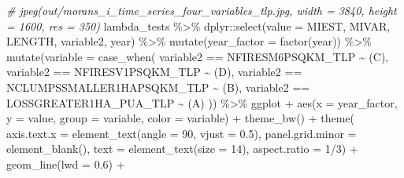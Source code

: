 \documentclass[10pt,landscape,a3paper]{article}
\newenvironment{Shaded}{\begin{snugshade}}{\end{snugshade}}
\newcommand{\AttributeTok}[1]{\textcolor[rgb]{0.77,0.63,0.00}{#1}}
\newcommand{\CommentTok}[1]{\textcolor[rgb]{0.56,0.35,0.01}{\textit{#1}}}
\newcommand{\DecValTok}[1]{\textcolor[rgb]{0.00,0.00,0.81}{#1}}
\newcommand{\FloatTok}[1]{\textcolor[rgb]{0.00,0.00,0.81}{#1}}
\newcommand{\FunctionTok}[1]{\textcolor[rgb]{0.00,0.00,0.00}{#1}}
\newcommand{\NormalTok}[1]{#1}
\newcommand{\SpecialCharTok}[1]{\textcolor[rgb]{0.00,0.00,0.00}{#1}}
\newcommand{\StringTok}[1]{\textcolor[rgb]{0.31,0.60,0.02}{#1}}
\begin{document}
\begin{Shaded}
\begin{Highlighting}[]
\CommentTok{\# jpeg(\textquotesingle{}out/morans\_i\_time\_series\_four\_variables\_tlp.jpg\textquotesingle{}, width = 3840, height = 1600, res = 350)}
\NormalTok{lambda\_tests }\SpecialCharTok{\%\textgreater{}\%} 
\NormalTok{  dplyr}\SpecialCharTok{::}\FunctionTok{select}\NormalTok{(}\AttributeTok{value =}\NormalTok{ MIEST, MIVAR, LENGTH, variable2, year) }\SpecialCharTok{\%\textgreater{}\%} 
  \FunctionTok{mutate}\NormalTok{(}\AttributeTok{year\_factor =} \FunctionTok{factor}\NormalTok{(year)) }\SpecialCharTok{\%\textgreater{}\%} 
    \FunctionTok{mutate}\NormalTok{(}\AttributeTok{variable =} \FunctionTok{case\_when}\NormalTok{(}
\NormalTok{    variable2 }\SpecialCharTok{==} \StringTok{\textquotesingle{}NFIRESM6PSQKM\_TLP\textquotesingle{}} \SpecialCharTok{\textasciitilde{}} \StringTok{\textquotesingle{}(C)\textquotesingle{}}\NormalTok{,}
\NormalTok{    variable2 }\SpecialCharTok{==} \StringTok{\textquotesingle{}NFIRESV1PSQKM\_TLP\textquotesingle{}} \SpecialCharTok{\textasciitilde{}} \StringTok{\textquotesingle{}(D)\textquotesingle{}}\NormalTok{,}
\NormalTok{    variable2 }\SpecialCharTok{==} \StringTok{\textquotesingle{}NCLUMPSSMALLER1HAPSQKM\_TLP\textquotesingle{}} \SpecialCharTok{\textasciitilde{}} \StringTok{\textquotesingle{}(B)\textquotesingle{}}\NormalTok{,}
\NormalTok{    variable2 }\SpecialCharTok{==} \StringTok{\textquotesingle{}LOSSGREATER1HA\_PUA\_TLP\textquotesingle{}} \SpecialCharTok{\textasciitilde{}} \StringTok{\textquotesingle{}(A)\textquotesingle{}}
\NormalTok{    )) }\SpecialCharTok{\%\textgreater{}\%} 
\NormalTok{  ggplot }\SpecialCharTok{+}
  \FunctionTok{aes}\NormalTok{(}\AttributeTok{x =}\NormalTok{ year\_factor, }\AttributeTok{y =}\NormalTok{ value, }\AttributeTok{group =}\NormalTok{ variable, }\AttributeTok{color =}\NormalTok{ variable) }\SpecialCharTok{+}
  \FunctionTok{theme\_bw}\NormalTok{() }\SpecialCharTok{+}
  \FunctionTok{theme}\NormalTok{(}
    \AttributeTok{axis.text.x =} \FunctionTok{element\_text}\NormalTok{(}\AttributeTok{angle =} \DecValTok{90}\NormalTok{, }\AttributeTok{vjust =} \FloatTok{0.5}\NormalTok{),}
    \AttributeTok{panel.grid.minor =} \FunctionTok{element\_blank}\NormalTok{(),}
    \AttributeTok{text =} \FunctionTok{element\_text}\NormalTok{(}\AttributeTok{size =} \DecValTok{14}\NormalTok{), }\AttributeTok{aspect.ratio =} \DecValTok{1}\SpecialCharTok{/}\DecValTok{3}\NormalTok{) }\SpecialCharTok{+}
  \FunctionTok{geom\_line}\NormalTok{(}\AttributeTok{lwd =} \FloatTok{0.6}\NormalTok{) }\SpecialCharTok{+}

\end{Highlighting}
\end{Shaded}
\end{document}
